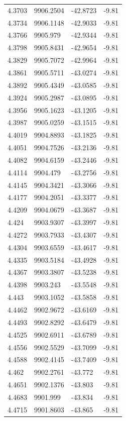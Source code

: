\begin{table}[H]
\begin{tabular}{llll}
4.3703 & 9906.2504 & -42.8723 & -9.81 \\
4.3734 & 9906.1148 & -42.9033 & -9.81 \\
4.3766 & 9905.979 & -42.9344 & -9.81 \\
4.3798 & 9905.8431 & -42.9654 & -9.81 \\
4.3829 & 9905.7072 & -42.9964 & -9.81 \\
4.3861 & 9905.5711 & -43.0274 & -9.81 \\
4.3892 & 9905.4349 & -43.0585 & -9.81 \\
4.3924 & 9905.2987 & -43.0895 & -9.81 \\
4.3956 & 9905.1623 & -43.1205 & -9.81 \\
4.3987 & 9905.0259 & -43.1515 & -9.81 \\
4.4019 & 9904.8893 & -43.1825 & -9.81 \\
4.4051 & 9904.7526 & -43.2136 & -9.81 \\
4.4082 & 9904.6159 & -43.2446 & -9.81 \\
4.4114 & 9904.479 & -43.2756 & -9.81 \\
4.4145 & 9904.3421 & -43.3066 & -9.81 \\
4.4177 & 9904.2051 & -43.3377 & -9.81 \\
4.4209 & 9904.0679 & -43.3687 & -9.81 \\
4.424 & 9903.9307 & -43.3997 & -9.81 \\
4.4272 & 9903.7933 & -43.4307 & -9.81 \\
4.4304 & 9903.6559 & -43.4617 & -9.81 \\
4.4335 & 9903.5184 & -43.4928 & -9.81 \\
4.4367 & 9903.3807 & -43.5238 & -9.81 \\
4.4398 & 9903.243 & -43.5548 & -9.81 \\
4.443 & 9903.1052 & -43.5858 & -9.81 \\
4.4462 & 9902.9672 & -43.6169 & -9.81 \\
4.4493 & 9902.8292 & -43.6479 & -9.81 \\
4.4525 & 9902.6911 & -43.6789 & -9.81 \\
4.4556 & 9902.5529 & -43.7099 & -9.81 \\
4.4588 & 9902.4145 & -43.7409 & -9.81 \\
4.462 & 9902.2761 & -43.772 & -9.81 \\
4.4651 & 9902.1376 & -43.803 & -9.81 \\
4.4683 & 9901.999 & -43.834 & -9.81 \\
4.4715 & 9901.8603 & -43.865 & -9.81 \\

\end{tabular}
\end{table}
